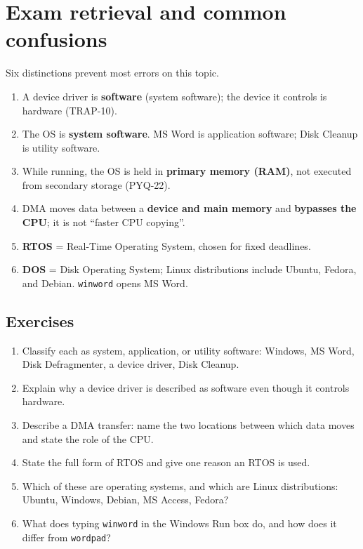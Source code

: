 \documentclass[11pt]{article}
\begin{document}
\section{Exam retrieval and common confusions}
Six distinctions prevent most errors on this topic.
\begin{enumerate}
  \item A device driver is \textbf{software} (system software); the device it
    controls is hardware (TRAP-10).
  \item The OS is \textbf{system software}. MS Word is application software;
    Disk Cleanup is utility software.
  \item While running, the OS is held in \textbf{primary memory (RAM)}, not
    executed from secondary storage (PYQ-22).
  \item DMA moves data between a \textbf{device and main memory} and
    \textbf{bypasses the CPU}; it is not ``faster CPU copying''.
  \item \textbf{RTOS} = Real-Time Operating System, chosen for fixed
    deadlines.
  \item \textbf{DOS} = Disk Operating System; Linux distributions include
    Ubuntu, Fedora, and Debian. \texttt{winword} opens MS Word.
\end{enumerate}

\subsection*{Exercises}
\begin{enumerate}[label=\arabic*.]
  \item Classify each as system, application, or utility software: Windows,
    MS Word, Disk Defragmenter, a device driver, Disk Cleanup.
  \item Explain why a device driver is described as software even though it
    controls hardware.
  \item Describe a DMA transfer: name the two locations between which data
    moves and state the role of the CPU.
  \item State the full form of RTOS and give one reason an RTOS is used.
  \item Which of these are operating systems, and which are Linux
    distributions: Ubuntu, Windows, Debian, MS Access, Fedora?
  \item What does typing \texttt{winword} in the Windows Run box do, and how
    does it differ from \texttt{wordpad}?
\end{enumerate}
\end{document}
